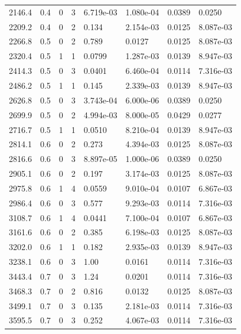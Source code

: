 \documentclass[preview]{standalone}
\begin{document}
{{{\begin{tabular}{L{1.2cm}C{1.2cm} C{0.3cm}C{0.5cm} C{1.4cm}C{1.4cm} C{1.4cm}C{1.4cm}}
  2146.4  &   0.4  & 0     &  3 &  6.719e-03  & 1.080e-04  & 0.0389 &  0.0250   \\ 
  2209.2  &   0.4  & 0     &  2 &  0.134  & 2.154e-03  & 0.0125 &  8.087e-03   \\ 
  2266.8  &   0.5  & 0     &  2 &  0.789  & 0.0127  & 0.0125 &  8.087e-03   \\ 
  2320.4  &   0.5  & 1     &  1 &  0.0799  & 1.287e-03  & 0.0139 &  8.947e-03   \\ 
  2414.3  &   0.5  & 0     &  3 &  0.0401  & 6.460e-04  & 0.0114 &  7.316e-03   \\ 
  2486.2  &   0.5  & 1     &  1 &  0.145  & 2.339e-03  & 0.0139 &  8.947e-03   \\ 
  2626.8  &   0.5  & 0     &  3 &  3.743e-04  & 6.000e-06  & 0.0389 &  0.0250   \\ 
  2699.9  &   0.5  & 0     &  2 &  4.994e-03  & 8.000e-05  & 0.0429 &  0.0277   \\ 
  2716.7  &   0.5  & 1     &  1 &  0.0510  & 8.210e-04  & 0.0139 &  8.947e-03   \\ 
  2814.1  &   0.6  & 0     &  2 &  0.273  & 4.394e-03  & 0.0125 &  8.087e-03   \\ 
  2816.6  &   0.6  & 0     &  3 &  8.897e-05  & 1.000e-06  & 0.0389 &  0.0250   \\ 
  2905.1  &   0.6  & 0     &  2 &  0.197  & 3.174e-03  & 0.0125 &  8.087e-03   \\ 
  2975.8  &   0.6  & 1     &  4 &  0.0559  & 9.010e-04  & 0.0107 &  6.867e-03   \\ 
  2986.4  &   0.6  & 0     &  3 &  0.577  & 9.293e-03  & 0.0114 &  7.316e-03   \\ 
  3108.7  &   0.6  & 1     &  4 &  0.0441  & 7.100e-04  & 0.0107 &  6.867e-03   \\ 
  3161.6  &   0.6  & 0     &  2 &  0.385  & 6.198e-03  & 0.0125 &  8.087e-03   \\ 
  3202.0  &   0.6  & 1     &  1 &  0.182  & 2.935e-03  & 0.0139 &  8.947e-03   \\ 
  3238.1  &   0.6  & 0     &  3 &  1.00  & 0.0161  & 0.0114 &  7.316e-03   \\ 
  3443.4  &   0.7  & 0     &  3 &  1.24  & 0.0201  & 0.0114 &  7.316e-03   \\ 
  3468.3  &   0.7  & 0     &  2 &  0.816  & 0.0132  & 0.0125 &  8.087e-03   \\ 
  3499.1  &   0.7  & 0     &  3 &  0.135  & 2.181e-03  & 0.0114 &  7.316e-03   \\ 
  3595.5  &   0.7  & 0     &  3 &  0.252  & 4.067e-03  & 0.0114 &  7.316e-03   \\ 

\end{tabular}}}}
\end{document}
